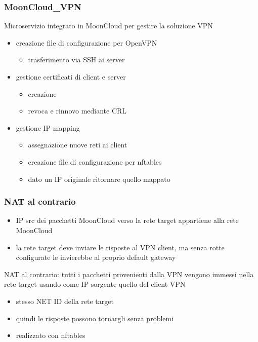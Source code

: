 \begin{frame}
    \frametitle{MoonCloud\_VPN}
    \alert{Microservizio} integrato in MoonCloud per gestire la soluzione VPN
    \begin{itemize}
        \item creazione file di \alert{configurazione} per \alert{OpenVPN}
        \begin{itemize}
            \item \alert{trasferimento} via SSH ai server
        \end{itemize}
        \item gestione \alert{certificati} di client e server
        \begin{itemize}
            \item creazione
            \item revoca e rinnovo mediante \alert{CRL}
        \end{itemize}
        \item gestione \alert{IP mapping}
        \begin{itemize}
            \item assegnazione nuove reti ai client
            \item creazione file di \alert{configurazione} per \alert{nftables}
            \item dato un IP originale ritornare quello mappato
        \end{itemize}
    \end{itemize}
\end{frame}


\begin{frame}
	\frametitle{NAT al contrario}
	
	\begin{itemize}
		\item IP src dei pacchetti MoonCloud verso la rete target
		      appartiene alla rete MoonCloud
		\item la rete target deve inviare le risposte al VPN client, ma senza
		      rotte configurate le invierebbe al proprio default gateway
	\end{itemize}
	
	\alert{NAT al contrario}: tutti i pacchetti provenienti dalla VPN vengono
	immessi nella rete target usando come IP sorgente quello del client VPN
	\begin{itemize}
		\item stesso NET ID della rete target
		\item quindi le risposte possono tornargli senza problemi
		\item realizzato con \alert{nftables}
	\end{itemize}
\end{frame}


